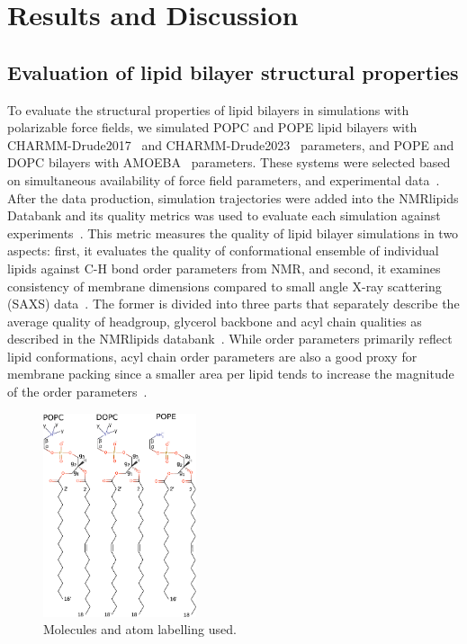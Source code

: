 \documentclass[journal=jacsat,manuscript=article,layout=singlecolumn]{achemso}
\begin{document}
 



 
\section{Results and Discussion}

\subsection{Evaluation of lipid bilayer structural properties}

To evaluate the structural properties of lipid bilayers in simulations with polarizable force fields, we simulated POPC and POPE lipid bilayers with CHARMM-Drude2017~\cite{li2017drude} and CHARMM-Drude2023~\cite{yu2023drude} parameters, and POPE and DOPC bilayers with AMOEBA~\cite{chu2018anionicpolarizable,chu2018polarizable} parameters. These systems were selected based on simultaneous availability of force field parameters, and experimental data~\cite{Databank}. After the data production, simulation trajectories were added into the NMRlipids Databank and its quality metrics was used to evaluate each simulation against experiments~\cite{Databank}. This metric measures the quality of lipid bilayer simulations in two aspects: first, it evaluates the quality of conformational ensemble of individual lipids against C-H bond order parameters from NMR, and second, it examines consistency of membrane dimensions compared to small angle X-ray scattering (SAXS) data~\cite{Databank,ollila16}. 
The former is divided into three parts that separately describe the average quality of headgroup, glycerol backbone and acyl chain qualities as described in the NMRlipids databank~\cite{Databank}. While order parameters primarily reflect lipid conformations, acyl chain order parameters are also a good proxy for membrane packing since a smaller area per lipid tends to increase the magnitude of the order parameters~\cite{Databank}. 

\begin{figure}[t]
    \centering
    \includegraphics[width=0.4\textwidth]{Figures/molecules.pdf}
    \caption{Molecules and atom labelling used.}
    \label{fig:molecules}

\end{figure}
\end{document}
